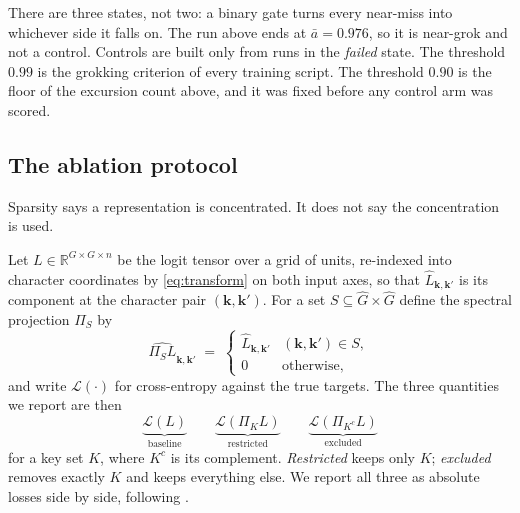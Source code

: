 There are three states, not two: a binary gate turns every near-miss into whichever side it
falls on. The run above ends at $\bar{a} = 0.976$, so it is near-grok and not a
control. Controls are built only from runs in the \emph{failed} state. The threshold $0.99$ is
the grokking criterion of every training script. The threshold $0.90$ is the floor of the
excursion count above, and it was fixed before any control arm was scored.

\subsection{The ablation protocol}
\label{sec:methods-causal}

Sparsity says a representation is concentrated. It does not say the concentration is used.

Let $L \in \mathbb{R}^{G \times G \times n}$ be the logit tensor over a grid of units,
re-indexed into character coordinates by \eqref{eq:transform} on both input axes, so that
$\widehat{L}_{\mathbf{k}, \mathbf{k}'}$ is its component at the character pair
$(\mathbf{k}, \mathbf{k}')$. For a set $S \subseteq \widehat{G} \times \widehat{G}$ define the
spectral projection $\Pi_{S}$ by
\begin{equation}
  \label{eq:project}
  \widehat{\Pi_{S} L}_{\mathbf{k}, \mathbf{k}'} \;=\;
  \begin{cases}
    \widehat{L}_{\mathbf{k}, \mathbf{k}'} & (\mathbf{k}, \mathbf{k}') \in S, \\
    0 & \text{otherwise,}
  \end{cases}
\end{equation}
and write $\mathcal{L}(\cdot)$ for cross-entropy against the true targets. The three
quantities we report are then
\begin{equation}
  \label{eq:ablation}
  \underbrace{\mathcal{L}(L)}_{\text{baseline}}
  \qquad
  \underbrace{\mathcal{L}(\Pi_{K} L)}_{\text{restricted}}
  \qquad
  \underbrace{\mathcal{L}(\Pi_{K^{c}} L)}_{\text{excluded}}
\end{equation}
for a key set $K$, where $K^{c}$ is its complement. \emph{Restricted} keeps only $K$;
\emph{excluded} removes exactly $K$ and keeps everything else. We report all three as absolute
losses side by side, following \citet{chughtai2023toy}.

